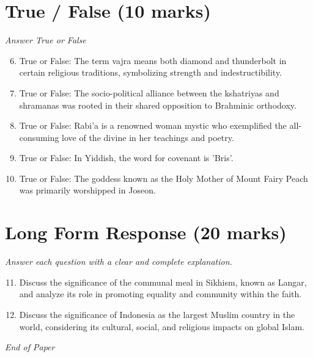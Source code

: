 \documentclass[12pt]{article}
\begin{document}
\section*{True / False (10 marks)}
\textit{Answer True or False}
\begin{enumerate}[label=\arabic*.]
\setcounter{enumi}{5}
\item True or False: The term vajra means both diamond and thunderbolt in certain religious traditions, symbolizing strength and indestructibility.
\item True or False: The socio-political alliance between the kshatriyas and shramanas was rooted in their shared opposition to Brahminic orthodoxy.
\item True or False: Rabi'a is a renowned woman mystic who exemplified the all-consuming love of the divine in her teachings and poetry.
\item True or False: In Yiddish, the word for covenant is 'Bris'.
\item True or False: The goddess known as the Holy Mother of Mount Fairy Peach was primarily worshipped in Joseon.
\end{enumerate}

\section*{Long Form Response (20 marks)}
\textit{Answer each question with a clear and complete explanation.}
\begin{enumerate}[label=\arabic*.]
\setcounter{enumi}{10}
\item Discuss the significance of the communal meal in Sikhism, known as Langar, and analyze its role in promoting equality and community within the faith.
\item Discuss the significance of Indonesia as the largest Muslim country in the world, considering its cultural, social, and religious impacts on global Islam.
\end{enumerate}

\vfill
\noindent\textit{End of Paper}
\end{document}
